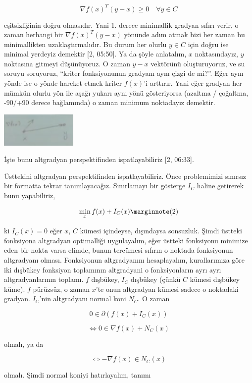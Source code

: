 \documentclass[12pt,fleqn]{article}\usepackage{../../common}
\begin{document}
$$
\nabla f(x)^T (y-x) \ge 0 \quad \forall y \in C
$$

eşitsizliğinin doğru olmasıdır. Yani 1. derece minimallik gradyan sıfırı
verir, o zaman herhangi bir $\nabla f(x)^T(y-x)$ yönünde adım atmak bizi
her zaman bu minimallikten uzaklaştırmalıdır. Bu durum her olurlu $y \in C$
için doğru ise minimal yerdeyiz demektir [2, 05:50]. Ya da şöyle anlatalım,
$x$ noktasındayız, $y$ noktasına gitmeyi düşünüyoruz. O zaman $y-x$
vektörünü oluşturuyoruz, ve su soruyu soruyoruz, ``kriter fonksiyonunun
gradyanı aynı çizgi de mi?''. Eğer aynı yönde ise o yönde hareket etmek
kriter $f(x)$'i arttırır. Yani eğer gradyan her mümkün olurlu yön ile aşağı
yukarı aynı yönü gösteriyorsa (azaltma / çoğaltma, -90/+90 derece
bağlamında) o zaman minimum noktadayız demektir. 

\includegraphics[width=10em]{func_42_subgrad_07.png}

İşte bunu altgradyan perspektifinden ispatlayabiliriz [2, 06:33]. 

Üsttekini altgradyan perspektifinden ispatlayabiliriz. Önce problemimizi
sınırsız bir formatta tekrar tanımlayacağız.  Sınırlamayı bir gösterge $I_C$
haline getirerek bunu yapabiliriz,

$$
\min_x f(x) + I_C(x)
\mlabel{2}
$$

ki $I_C(x) = 0$ eğer $x$, $C$ kümesi içindeyse, dışındaysa sonsuzluk. Şimdi
üstteki fonksiyona altgradyan optimalliği uygulayalım, eğer üstteki
fonksiyonu minimize eden bir nokta varsa elimde, bunun tercümesi sıfırın o
noktada fonksiyonun altgradyanı olması. Fonksiyonun altgradyanını
hesaplayalım, kurallarımıza göre iki dışbükey fonksiyon toplamının
altgradyani o fonksiyonların ayrı ayrı altgradyanlarının toplamı. $f$
dışbükey, $I_C$ dışbükey (çünkü $C$ kümesi dışbükey küme). $f$ pürüzsüz, o
zaman $x$'te onun altgradyan kümesi sadece o noktadaki gradyan. $I_C$'nin
altgradyanı normal koni $N_C$. O zaman 

$$
0 \in \partial ( f(x) + I_C(x) ) 
$$

$$
\iff 0 \in \nabla f(x) + N_C(x) 
$$


olmalı, ya da

$$
\iff - \nabla f(x) \in N_C(x) 
$$

olmalı. Şimdi normal koniyi hatırlayalım, tanımı
\end{document}
